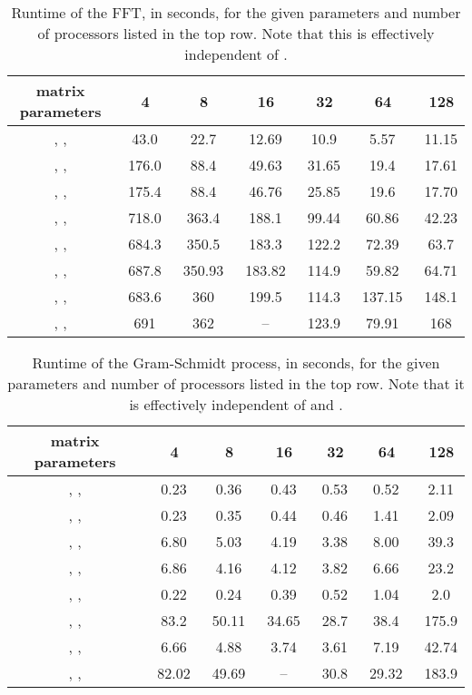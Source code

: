 \documentclass[11pt]{article}
\begin{document}
\begin{table}[here]
\centering
\begin{tabular}{|c|c|c|c|c|c|c|}\hline
matrix parameters &\ 4 &\ 8 &\ 16 &\ 32 &\ 64 &\ 128  \\ \hline
, ,  &\ 43.0 &\ 22.7 &\ 12.69  &\  10.9 &\  5.57  &\   11.15 \\ 
, ,  &\  176.0 &\ 88.4 &\  49.63 &\  31.65 &\    19.4 &\  17.61 \\ 
, ,  &\  175.4  &\  88.4 &\  46.76  &\  25.85 &\   19.6 &\  17.70 \\ 
, ,  &\  718.0  &\ 363.4  &\  188.1  &\ 99.44   &\  60.86   &\ 42.23  \\ 
, ,  &\  684.3 &\  350.5 &\  183.3 &\  122.2 &\  72.39  &\  63.7  \\ 
, ,  &\   687.8  &\  350.93 &\  183.82 &\ 114.9  &\  59.82   &\  64.71  \\ 
, ,  &\  683.6 &\ 360 &\  199.5  &\  114.3  &\  137.15  &\  148.1  \\ 
, ,  &\  691  &\  362 &\  -- &\   123.9 &\   79.91 &\ 168  \\  \hline
\end{tabular}
\caption{Runtime of the FFT, in seconds, for the given parameters and number of processors listed in the top row.  Note that this is effectively independent of .}
\label{bigt1}
\end{table}
\begin{table}[here]
\centering
\begin{tabular}{|c|c|c|c|c|c|c|}\hline
matrix parameters &\ 4 &\ 8 &\ 16 &\ 32 &\ 64 &\ 128  \\ \hline
, ,  &\ 0.23 &\ 0.36 &\  0.43 &\  0.53  &\  0.52   &\  2.11 \\ 
, ,  &\  0.23  &\  0.35 &\  0.44  &\  0.46 &\  1.41   &\  2.09  \\ 
, ,  &\  6.80 &\ 5.03 &\ 4.19  &\  3.38 &\   8.00 &\  39.3  \\ 
, ,  &\  6.86 &\  4.16 &\  4.12 &\   3.82 &\  6.66  &\ 23.2  \\ 
, ,  &\  0.22 &\ 0.24  &\ 0.39   &\  0.52 &\  1.04   &\ 2.0  \\ 
, ,  &\  83.2 &\ 50.11  &\  34.65 &\  28.7 &\ 38.4   &\  175.9 \\ 
, ,  &\  6.66 &\  4.88 &\ 3.74  &\  3.61  &\    7.19 &\  42.74  \\ 
, ,  &\ 82.02  &\  49.69 &\  --  &\  30.8 &\   29.32 &\  183.9 \\  \hline
\end{tabular}
\caption{Runtime of the Gram-Schmidt process, in seconds, for the given parameters and number of processors listed in the top row.   Note that it is effectively independent of  and .}
\label{bigt2}
\end{table}
\end{document}
